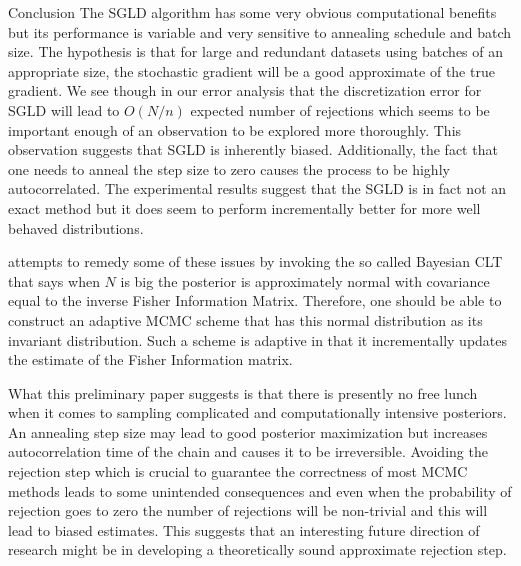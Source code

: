 \documentclass{article}
\begin{document}
\begin{section}{Conclusion}
The SGLD algorithm has some very obvious computational benefits but its performance is variable and very sensitive to annealing schedule and batch size. The hypothesis is that for large and redundant datasets using batches of an appropriate size, the stochastic gradient will be a good approximate of the true gradient.  We see though in our error analysis that the discretization error for SGLD will lead to $O(N/n)$ expected number of rejections which seems to be important enough of an observation to be explored more thoroughly.  This observation suggests that SGLD is inherently biased.  Additionally, the fact that one needs to anneal the step size to zero causes the process to be highly autocorrelated.  The experimental results suggest that the SGLD is in fact not an exact method but it does seem to perform incrementally better for more well behaved distributions.

\cite{AhnBW12} attempts to remedy some of these issues by invoking the so called Bayesian CLT that says when $N$ is big the posterior is approximately normal with covariance equal to the inverse Fisher Information Matrix.  Therefore, one should be able to construct an adaptive MCMC scheme that has this normal distribution as its invariant distribution.  Such a scheme is adaptive in that it incrementally updates the estimate of the Fisher Information matrix. 

What this preliminary paper suggests is that there is presently no free lunch when it comes to sampling complicated and computationally intensive posteriors.  An annealing step size may lead to good posterior maximization but increases autocorrelation time of the chain and causes it to be irreversible.  Avoiding the rejection step which is crucial to guarantee the correctness of most MCMC methods leads to some unintended consequences and even when the probability of rejection goes to zero the number of rejections will be non-trivial and this will lead to biased estimates.  This suggests that an interesting future direction of research might be in developing a theoretically sound approximate rejection step.
\end{section}
{}

\newpage
\end{document}

